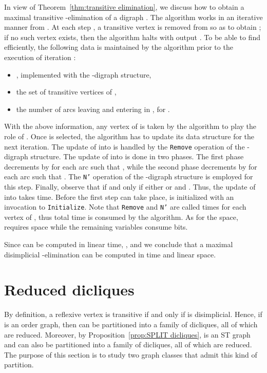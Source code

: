 \documentclass[a4paper,11pt]{article}
\begin{document}
In view of Theorem~\ref{thm:transitive elimination}, we discuss how to obtain a maximal transitive -elimination of a digraph .  The algorithm works in an iterative manner from .  At each step , a transitive vertex  is removed from  so as to obtain ; if no such vertex exists, then the algorithm halts with output .  To be able to find  efficiently, the following data is maintained by the algorithm prior to the execution of iteration :
\begin{itemize}
 \item , implemented with the -digraph structure,
 \item the set of transitive vertices  of ,
 \item the number  of arcs leaving  and entering  in , for .
\end{itemize}
With the above information, any vertex of  is taken by the algorithm to play the role of . Once  is selected, the algorithm has to update its data structure for the next iteration.  The update of  into  is handled by the \texttt{Remove} operation of the -digraph structure.  The update of  into  is done in two phases.  The first phase decrements  by  for each arc  such that , while the second phase decrements  by  for each arc  such that .  The \texttt{N'} operation of the -digraph structure is employed for this step.  Finally, observe that  if and only if either  or  and .  Thus, the update of  into  takes  time.  Before the first step can take place,  is initialized with an invocation to \texttt{Initialize}.  Note that \texttt{Remove} and \texttt{N'} are called  times for each vertex of , thus  total time is consumed by the algorithm.  As for the space,  requires  space while the remaining variables consume  bits.

Since  can be computed in linear time, , and  we conclude that a maximal disimplicial -elimination can be computed in  time and linear space.

\section{Reduced dicliques}
\label{sec:WDI and DI}

By definition, a reflexive vertex  is transitive if and only if  is disimplicial. Hence, if  is an order graph, then  can be partitioned into a family of dicliques, all of which are reduced.  Moreover, by Proposition~\ref{prop:SPLIT dicliques},  is an ST graph and  can also be partitioned into a family of dicliques, all of which are reduced.  The purpose of this section is to study two graph classes that admit this kind of partition.
\end{document}
